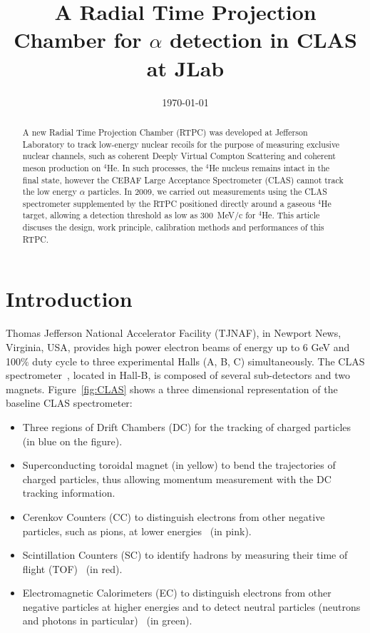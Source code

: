 \documentclass[twocolumn,showpacs,superscriptaddress,groupedaddress]{revtex4}
\begin{document}
\title{\vspace{-15mm}\fontsize{24pt}{10pt}\selectfont\textbf{A Radial Time 
Projection Chamber for $\alpha$ detection in CLAS at JLab}}
  

\date{\today}

\begin{abstract}
A new Radial Time Projection Chamber (RTPC) was developed at Jefferson 
Laboratory to track low-energy nuclear recoils for the purpose of measuring
exclusive nuclear channels, such as coherent Deeply Virtual Compton Scattering
and coherent meson production on $^4$He. In such processes, the $^4$He nucleus
remains intact in the final state, however the CEBAF Large
Acceptance Spectrometer (CLAS) cannot track the low energy $\alpha$ particles. In
2009, we carried out measurements using the CLAS spectrometer supplemented by
the RTPC positioned directly around a gaseous $^4$He target, allowing a detection
threshold as low as 300~MeV/c for $^4$He. This article discuses the design,
work principle, calibration methods and performances of this RTPC.
\end{abstract}

\maketitle

\section{Introduction} \label{sec:level1}

Thomas Jefferson National Accelerator Facility (TJNAF), in Newport News, Virginia,
USA, provides high power electron beams of energy up to 6 GeV and 100$\%$ duty cycle
to three experimental Halls (A, B, C) simultaneously. The CLAS 
spectrometer~\cite{CLASref}, located
in Hall-B, is composed of several sub-detectors and two magnets. 
Figure~\ref{fig:CLAS} shows a three dimensional 
representation of the baseline CLAS spectrometer:
\begin{itemize}
 \item Three regions of Drift Chambers (DC) for the tracking of charged 
    particles~\cite{DCref} (in blue on the figure).
 \item Superconducting toroidal magnet (in yellow) to bend the trajectories 
    of charged particles, thus allowing momentum measurement with the DC tracking information.
 \item Cerenkov Counters (CC) to distinguish electrons from other negative 
    particles, such as pions, at lower energies~\cite{CCref} (in pink).
 \item Scintillation Counters (SC) to identify hadrons by measuring their 
    time of flight (TOF)~\cite{TOFref} (in red).
 \item Electromagnetic Calorimeters (EC) to distinguish electrons from other negative 
    particles at higher energies and to detect neutral particles (neutrons and 
    photons in particular)~\cite{ECref} (in green).
\end{itemize}
\end{document}

